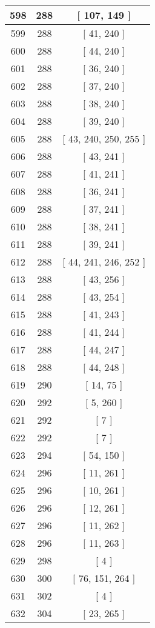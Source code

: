 \begin{center}
\begin{longtable}[H]{|| c c c ||}
\hline
598 & 288 & [ 107, 149 ] \\ 
\hline
599 & 288 & [ 41, 240 ] \\ 
\hline
600 & 288 & [ 44, 240 ] \\ 
\hline
601 & 288 & [ 36, 240 ] \\ 
\hline
602 & 288 & [ 37, 240 ] \\ 
\hline
603 & 288 & [ 38, 240 ] \\ 
\hline
604 & 288 & [ 39, 240 ] \\ 
\hline
605 & 288 & [ 43, 240, 250, 255 ] \\ 
\hline
606 & 288 & [ 43, 241 ] \\ 
\hline
607 & 288 & [ 41, 241 ] \\ 
\hline
608 & 288 & [ 36, 241 ] \\ 
\hline
609 & 288 & [ 37, 241 ] \\ 
\hline
610 & 288 & [ 38, 241 ] \\ 
\hline
611 & 288 & [ 39, 241 ] \\ 
\hline
612 & 288 & [ 44, 241, 246, 252 ] \\ 
\hline
613 & 288 & [ 43, 256 ] \\ 
\hline
614 & 288 & [ 43, 254 ] \\ 
\hline
615 & 288 & [ 41, 243 ] \\ 
\hline
616 & 288 & [ 41, 244 ] \\ 
\hline
617 & 288 & [ 44, 247 ] \\ 
\hline
618 & 288 & [ 44, 248 ] \\ 
\hline
619 & 290 & [ 14, 75 ] \\ 
\hline
620 & 292 & [ 5, 260 ] \\ 
\hline
621 & 292 & [ 7 ] \\ 
\hline
622 & 292 & [ 7 ] \\ 
\hline
623 & 294 & [ 54, 150 ] \\ 
\hline
624 & 296 & [ 11, 261 ] \\ 
\hline
625 & 296 & [ 10, 261 ] \\ 
\hline
626 & 296 & [ 12, 261 ] \\ 
\hline
627 & 296 & [ 11, 262 ] \\ 
\hline
628 & 296 & [ 11, 263 ] \\ 
\hline
629 & 298 & [ 4 ] \\ 
\hline
630 & 300 & [ 76, 151, 264 ] \\ 
\hline
631 & 302 & [ 4 ] \\ 
\hline
632 & 304 & [ 23, 265 ] \\ 

\end{longtable}
\end{center}
